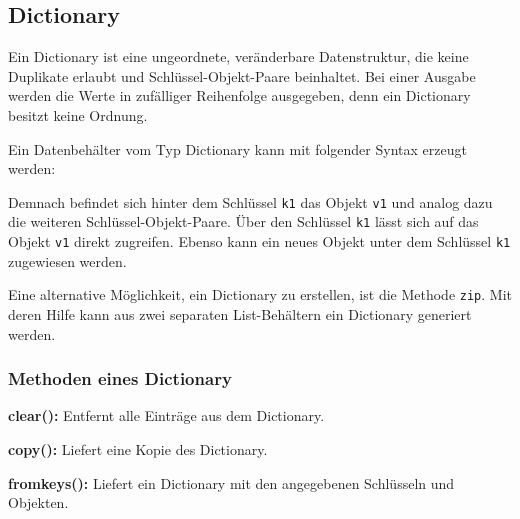 \subsection{Dictionary}
\label{collections:dictionary}

Ein Dictionary ist eine ungeordnete, veränderbare Datenstruktur, die keine Duplikate erlaubt und Schlüssel-Objekt-Paare beinhaltet. Bei einer Ausgabe werden die Werte in zufälliger Reihenfolge ausgegeben, denn ein Dictionary besitzt keine Ordnung.

Ein Datenbehälter vom Typ Dictionary kann mit folgender Syntax erzeugt werden:

\label{collections:lst:dictinit}

Demnach befindet sich hinter dem Schlüssel \lstinline$k1$ das Objekt \lstinline$v1$ und analog dazu die weiteren Schlüssel-Objekt-Paare. Über den Schlüssel \lstinline$k1$ lässt sich auf das Objekt \lstinline$v1$ direkt zugreifen. Ebenso kann ein neues Objekt unter dem Schlüssel \lstinline$k1$ zugewiesen werden.

\label{collections:lst:dictprint}

Eine alternative Möglichkeit, ein Dictionary zu erstellen, ist die Methode \lstinline$zip$. Mit deren Hilfe kann aus zwei separaten List-Behältern ein Dictionary generiert werden.

\label{collections:lst:dictzip}


\subsubsection{Methoden eines Dictionary}
\label{collections:dictionary:methodes}

\textbf{clear():}
Entfernt alle Einträge aus dem Dictionary.

\label{collections:lst:dictclear}

\textbf{copy():}
Liefert eine Kopie des Dictionary.

\label{collections:lst:dictcopy}

\textbf{fromkeys():}
Liefert ein Dictionary mit den angegebenen Schlüsseln und Objekten.

\label{collections:lst:dictfromkeys}

